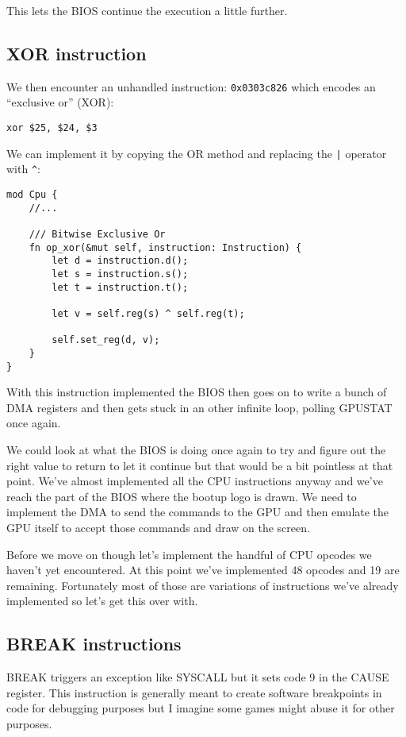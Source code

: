 \documentclass[a4paper]{article}
\newcommand{\code}[1] {\texttt{#1}}
\begin{document}
This lets the BIOS continue the execution a little further.

\subsection{XOR instruction}

We then encounter an unhandled instruction: \code{0x0303c826} which
encodes an ``exclusive or'' (XOR):

\begin{lstlisting}[language=assembly]
xor $25, $24, $3
\end{lstlisting}

We can implement it by copying the OR method and replacing the
\code{|} operator with \code{\^{}}:

\begin{lstlisting}
mod Cpu {
    //...

    /// Bitwise Exclusive Or
    fn op_xor(&mut self, instruction: Instruction) {
        let d = instruction.d();
        let s = instruction.s();
        let t = instruction.t();

        let v = self.reg(s) ^ self.reg(t);

        self.set_reg(d, v);
    }
}
\end{lstlisting}

With this instruction implemented the BIOS then goes on to write a
bunch of DMA registers and then gets stuck in an other infinite loop,
polling GPUSTAT once again.

We could look at what the BIOS is doing once again to try and figure
out the right value to return to let it continue but that would be a
bit pointless at that point. We've almost implemented all the CPU
instructions anyway and we've reach the part of the BIOS where the
bootup logo is drawn. We need to implement the DMA to send the
commands to the GPU and then emulate the GPU itself to accept those
commands and draw on the screen.

Before we move on though let's implement the handful of CPU opcodes we
haven't yet encountered. At this point we've implemented 48 opcodes
and 19 are remaining.  Fortunately most of those are variations of
instructions we've already implemented so let's get this over with.

\subsection{BREAK instructions}

BREAK triggers an exception like SYSCALL but it sets code 9 in the
CAUSE register. This instruction is generally meant to create software
breakpoints in code for debugging purposes but I imagine some games
might abuse it for other purposes.
\end{document}

